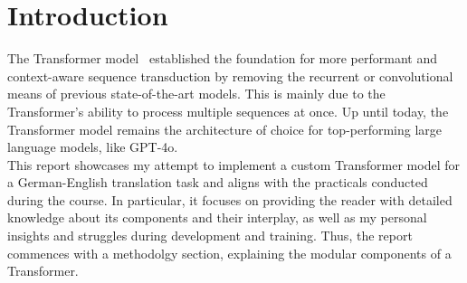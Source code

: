 \section{Introduction}

The Transformer model~\cite{vaswani2017attention} established the foundation for more performant and context-aware sequence transduction by removing the recurrent or convolutional means of previous state-of-the-art models.
This is mainly due to the Transformer's ability to process multiple sequences at once.
Up until today, the Transformer model remains the architecture of choice for top-performing large language models, like GPT-4o. \\
This report showcases my attempt to implement a custom Transformer model for a German-English translation task and aligns with the practicals conducted during the course.
In particular, it focuses on providing the reader with detailed knowledge about its components and their interplay, as well as my personal insights and struggles during development and training.
Thus, the report commences with a methodolgy section, explaining the modular components of a Transformer. 

